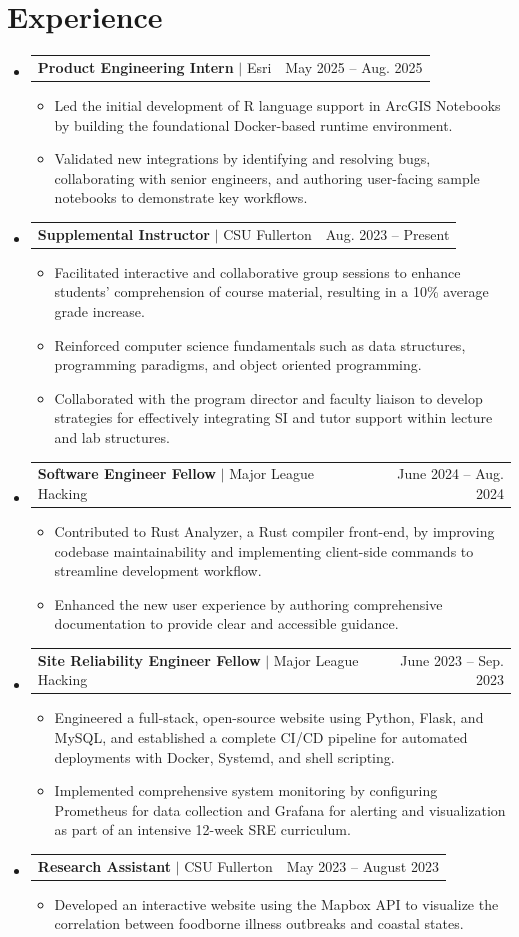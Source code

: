 \documentclass[letterpaper,11pt]{article}
\makeatletter
\newcommand{\resumeItem}[1]{
  \item\small{
    {#1 \vspace{-2pt}}
  }
}
\newcommand{\resumeProjectHeading}[2]{
    \item
    \begin{tabular*}{0.97\textwidth}{l@{\extracolsep{\fill}}r}
      \small#1 & #2 \\
    \end{tabular*}\vspace{-7pt}
}
\newcommand{\resumeSubHeadingListStart}{\begin{itemize}[leftmargin=0.15in, label={}]}
\newcommand{\resumeSubHeadingListEnd}{\end{itemize}}
\newcommand{\resumeItemListStart}{\begin{itemize}}
\newcommand{\resumeItemListEnd}{\end{itemize}\vspace{-5pt}}
\makeatother
\begin{document}
\section{Experience}
  \resumeSubHeadingListStart
    \resumeProjectHeading
            {\textbf{Product Engineering Intern} $|$ {Esri}}{May 2025 -- Aug. 2025}
            \resumeItemListStart
              \resumeItem{Led the initial development of R language support in ArcGIS Notebooks by building the foundational Docker-based runtime environment.}
              \resumeItem{Validated new integrations by identifying and resolving bugs, collaborating with senior engineers, and authoring user-facing sample notebooks to demonstrate key workflows.}
    \resumeItemListEnd
    \resumeProjectHeading
            {\textbf{Supplemental Instructor} $|$ {CSU Fullerton}}{Aug. 2023 -- Present}
            \resumeItemListStart
              \resumeItem{Facilitated interactive and collaborative group sessions to enhance students' comprehension of course material, resulting in a 10\% average grade increase.}
              \resumeItem{Reinforced computer science fundamentals such as data structures, programming paradigms, and object oriented programming.}
              \resumeItem{Collaborated with the program director and faculty liaison to develop strategies for effectively integrating SI and tutor support within lecture and lab structures.}
    \resumeItemListEnd
    \resumeProjectHeading
          {\textbf{Software Engineer Fellow} $|$ {Major League Hacking}}{June 2024 -- Aug. 2024}
          \resumeItemListStart
            \resumeItem{Contributed to Rust Analyzer, a Rust compiler front-end, by improving codebase maintainability and implementing client-side commands to streamline development workflow.}
            \resumeItem{Enhanced the new user experience by authoring comprehensive documentation to provide clear and accessible guidance.}
          \resumeItemListEnd
    \resumeProjectHeading
          {\textbf{Site Reliability Engineer Fellow} $|$ {Major League Hacking}}{June 2023 -- Sep. 2023}
          \resumeItemListStart
            \resumeItem{Engineered a full-stack, open-source website using Python, Flask, and MySQL, and established a complete CI/CD pipeline for automated deployments with Docker, Systemd, and shell scripting.}
            \resumeItem{Implemented comprehensive system monitoring by configuring Prometheus for data collection and Grafana for alerting and visualization as part of an intensive 12-week SRE curriculum.}
          \resumeItemListEnd
    \resumeProjectHeading
          {\textbf{Research Assistant} $|$ {CSU Fullerton}}{May 2023 -- August 2023}
          \resumeItemListStart
            \resumeItem{Developed an interactive website using the Mapbox API to visualize the correlation between foodborne illness outbreaks and coastal states.}
          \resumeItemListEnd
  \resumeSubHeadingListEnd
\end{document}

